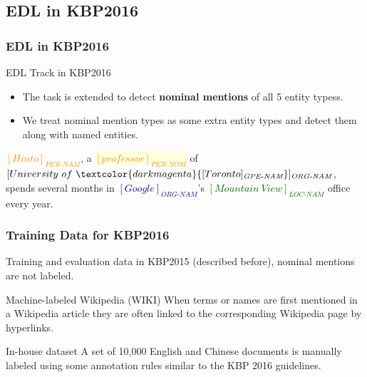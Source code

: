 \documentclass{beamer}
\begin{document}
\subsection{EDL in KBP2016}

\begin{frame}
\frametitle{EDL in KBP2016}
\begin{block}{EDL Track in KBP2016 \parencite{kbpoverview2016}}
\begin{itemize}
	\item The task is extended to detect \textbf{nominal mentions} of all 5 entity typess. 
	\item We treat nominal mention types as some extra entity types and detect them along with named entities.  
\end{itemize}
\end{block}
\begin{example}
	\textcolor{darkorange}{$[Hinto]_{\textit{PER-NAM}}$}, 
	a \colorbox{lightyellow}{\textcolor{darkorange}{$[professor]_{\textit{PER-NOM}}$}} of \textcolor{navy}{$[University\ of\ \textcolor{darkmagenta}{[Toronto]_{\textit{GPE-NAM}}}]_{\textit{ORG-NAM}}$}, 
	spends several months in \textcolor{navy}{$[Google]_{\textit{ORG-NAM}}$}'s 
	\textcolor{darkgreen}{$[Mountain\ View]_{\textit{LOC-NAM}}$} office every year.
\end{example}
\end{frame}

\begin{frame}
\frametitle{Training Data for KBP2016}
\begin{block}{Training and evaluation data in KBP2015}
	(described before), nominal mentions are not labeled.
\end{block}
\begin{block}{Machine-labeled Wikipedia (WIKI)}
	When terms or names are first mentioned in a Wikipedia article they are often linked to the corresponding Wikipedia page by hyperlinks. 
\end{block} 
\begin{block}{In-house dataset}
	A set of 10,000 English and Chinese documents is manually labeled using some annotation rules similar to the KBP 2016 guidelines.
\end{block}
\end{frame}
\end{document}
